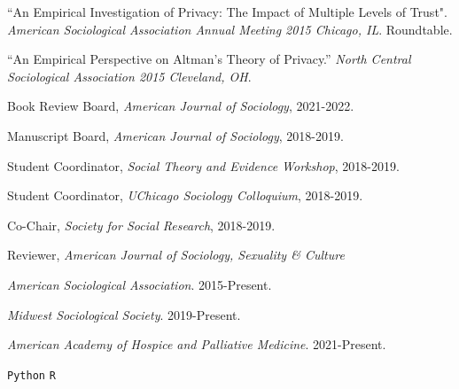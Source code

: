 \documentclass[11pt,article,oneside]{memoir}
\begin{document}
\ind “An Empirical Investigation of Privacy: The Impact of Multiple Levels of Trust". \emph{American Sociological Association Annual Meeting 2015 Chicago, IL}. Roundtable. \vspace{0.05in}

\ind “An Empirical Perspective on Altman’s Theory of Privacy.” \emph{North Central Sociological Association 2015 Cleveland, OH}.

\normalsize

\newpage

\medskip
{}
\medskip

\ind Book Review Board, \emph{American Journal of Sociology}, 2021-2022.

\ind Manuscript Board, \emph{American Journal of Sociology}, 2018-2019.

\ind Student Coordinator, \emph{Social Theory and Evidence Workshop}, 2018-2019.

\ind Student Coordinator, \emph{UChicago Sociology Colloquium}, 2018-2019.

\ind Co-Chair, \emph{Society for Social Research}, 2018-2019.

\ind Reviewer, \emph{American Journal of Sociology, Sexuality \& Culture}


\medskip
{}
\medskip

\ind \emph{American Sociological Association}. 2015-Present.

\ind \emph{Midwest Sociological Society}. 2019-Present.

\ind \emph{American Academy of Hospice and Palliative Medicine}. 2021-Present.

\medskip
{}
\medskip

\ind  \texttt{Python} \hspace{0.4in}  \texttt{R} \hspace{0.4in}
\end{document}
